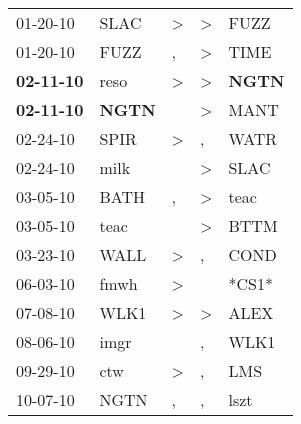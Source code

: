\begin{supertabular}{p{0.07\textwidth}p{0.06\textwidth}p{0.02\textwidth}p{0.02\textwidth}p{0.06\textwidth}}
          01-20-10\textsuperscript{} &           SLAC\textsuperscript{} &     \textgreater &     \textgreater &           FUZZ\textsuperscript{} \\
          01-20-10\textsuperscript{} &           FUZZ\textsuperscript{} &                , &     \textgreater &           TIME\textsuperscript{} \\
 \textbf{02-11-10\textsuperscript{}} &           reso\textsuperscript{} &     \textgreater &     \textgreater &  \textbf{NGTN\textsuperscript{}} \\
 \textbf{02-11-10\textsuperscript{}} &  \textbf{NGTN\textsuperscript{}} &                  &     \textgreater &           MANT\textsuperscript{} \\
          02-24-10\textsuperscript{} &           SPIR\textsuperscript{} &     \textgreater &                , &           WATR\textsuperscript{} \\
          02-24-10\textsuperscript{} &           milk\textsuperscript{} &                  &     \textgreater &           SLAC\textsuperscript{} \\
          03-05-10\textsuperscript{} &           BATH\textsuperscript{} &                , &     \textgreater &           teac\textsuperscript{} \\
          03-05-10\textsuperscript{} &           teac\textsuperscript{} &                  &     \textgreater &           BTTM\textsuperscript{} \\
          03-23-10\textsuperscript{} &           WALL\textsuperscript{} &     \textgreater &                , &           COND\textsuperscript{} \\
          06-03-10\textsuperscript{} &           fmwh\textsuperscript{} &     \textgreater &                  &                            *CS1* \\
          07-08-10\textsuperscript{} &           WLK1\textsuperscript{} &     \textgreater &     \textgreater &           ALEX\textsuperscript{} \\
          08-06-10\textsuperscript{} &           imgr\textsuperscript{} &                  &                , &           WLK1\textsuperscript{} \\
          09-29-10\textsuperscript{} &            ctw\textsuperscript{} &     \textgreater &                , &            LMS\textsuperscript{} \\
          10-07-10\textsuperscript{} &           NGTN\textsuperscript{} &                , &                , &           lszt\textsuperscript{} \\

\end{supertabular}
